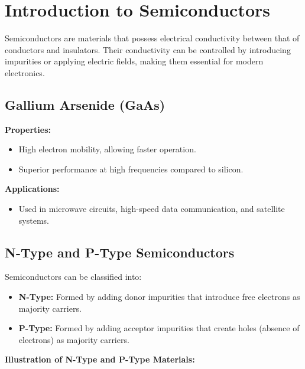 
\section{Introduction to Semiconductors}
Semiconductors are materials that possess electrical conductivity between that of conductors and insulators. Their conductivity can be controlled by introducing impurities or applying electric fields, making them essential for modern electronics.

\subsection*{Gallium Arsenide (GaAs)}
\textbf{Properties:}
\begin{itemize}
    \item High electron mobility, allowing faster operation.
    \item Superior performance at high frequencies compared to silicon.
\end{itemize}

\textbf{Applications:}
\begin{itemize}
    \item Used in microwave circuits, high-speed data communication, and satellite systems.
\end{itemize}

\subsection*{N-Type and P-Type Semiconductors}
Semiconductors can be classified into:
\begin{itemize}
    \item \textbf{N-Type:} Formed by adding donor impurities that introduce free electrons as majority carriers.
    \item \textbf{P-Type:} Formed by adding acceptor impurities that create holes (absence of electrons) as majority carriers.
\end{itemize}

\textbf{Illustration of N-Type and P-Type Materials:}

\begin{center}
\end{center}

